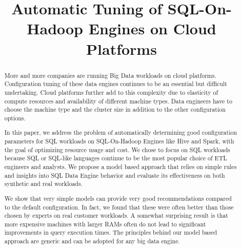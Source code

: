 \documentclass[10pt, conference, compsocconf]{IEEEtran}
\newcommand{\eat}[1]{}
\begin{document}
\title{Automatic Tuning of SQL-On-Hadoop Engines on Cloud Platforms}

\author{
	\and
	\and
}

\maketitle

\begin{abstract}
More and more companies are running Big Data workloads on cloud platforms. Configuration tuning of these data engines continues to be an essential but difficult undertaking. Cloud platforms further add to this complexity due to elasticity of compute resources and availability of different machine types. Data engineers have to choose the machine type and the cluster size in addition to the other configuration options.

In this paper, we address the problem of automatically determining good configuration parameters for SQL workloads on SQL-On-Hadoop Engines like Hive and Spark, with the goal of optimizing resource usage and cost. We chose to focus on SQL workloads because SQL or SQL-like languages continue to be the most popular choice of ETL engineers and analysts. We propose a model based approach that relies on simple rules and insights into SQL Data Engine behavior and evaluate its effectiveness on both synthetic and real workloads.

\eat{
We present two alternatives -- an iterative method based on repeatedly executing queries with different configuration parameters and a model based method relying on simple rules and insights. We studied the effectiveness and practical usefulness of these methods on both synthetic and real workloads.
}
We show that very simple models \eat{of SQL Data Engines} can provide very good recommendations compared to the default configuration. In fact, we found that these were often better than those chosen by experts on real customer workloads. A somewhat surprising result is that more expensive machines with larger RAMs often do not lead to significant improvements in query execution times. \eat{better outcomes in terms of overall query cost and execution times.} The principles behind our model based approach are generic and can be adopted for any big data engine. 
\end{abstract}

 
 
 
 \eat{}
 
 
 
 

 
\end{document}
